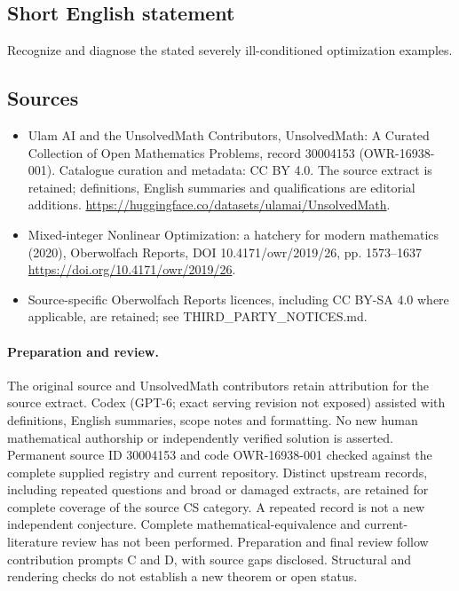 \documentclass[11pt]{article}
\begin{document}
\subsection{Short English statement}
Recognize and diagnose the stated severely ill-conditioned optimization examples.
\subsection{Sources}
\begin{itemize}
\item[\hypertarget{source:30004153:1}{S1}] Ulam AI and the UnsolvedMath Contributors, UnsolvedMath: A Curated Collection of Open Mathematics Problems, record 30004153 (OWR-16938-001). Catalogue curation and metadata: CC BY 4.0. The source extract is retained; definitions, English summaries and qualifications are editorial additions.
\url{https://huggingface.co/datasets/ulamai/UnsolvedMath}.
\item[\hypertarget{source:30004153:2}{S2}] Mixed-integer Nonlinear Optimization: a hatchery for modern mathematics (2020), Oberwolfach Reports, DOI 10.4171/owr/2019/26, pp. 1573--1637
\url{https://doi.org/10.4171/owr/2019/26}.
\item Source-specific Oberwolfach Reports licences, including CC BY-SA 4.0 where applicable, are retained; see THIRD\_PARTY\_NOTICES.md.
\end{itemize}
\paragraph{Preparation and review.}
The original source and UnsolvedMath contributors retain attribution for the source extract. Codex (GPT-6; exact serving revision not exposed) assisted with definitions, English summaries, scope notes and formatting. No new human mathematical authorship or independently verified solution is asserted. Permanent source ID 30004153 and code OWR-16938-001 checked against the complete supplied registry and current repository. Distinct upstream records, including repeated questions and broad or damaged extracts, are retained for complete coverage of the source CS category. A repeated record is not a new independent conjecture. Complete mathematical-equivalence and current-literature review has not been performed. Preparation and final review follow contribution prompts C and D, with source gaps disclosed. Structural and rendering checks do not establish a new theorem or open status.
\label{end:30004153}
\end{document}
